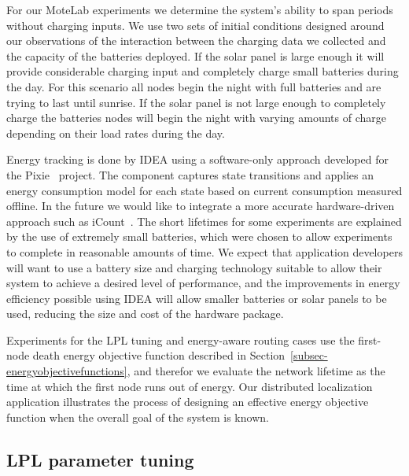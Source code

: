 For our MoteLab experiments we determine the system's ability to span periods
without charging inputs. We use two sets of initial conditions designed
around our observations of the interaction between the charging data we
collected and the capacity of the batteries deployed. If the solar panel is
large enough it will provide considerable charging input and completely
charge small batteries during the day. For this scenario all nodes begin the
night with full batteries and are trying to last until sunrise. If the solar
panel is not large enough to completely charge the batteries nodes will begin
the night with varying amounts of charge depending on their load rates during
the day.

Energy tracking is done by IDEA using a software-only approach developed for
the Pixie~\cite{pixie-sensys08} project. The component captures state
transitions and applies an energy consumption model for each state based on
current consumption measured offline. In the future we would like to
integrate a more accurate hardware-driven approach such as
iCount~\cite{icount-spots08}. The short lifetimes for some experiments are
explained by the use of extremely small batteries, which were chosen to allow
experiments to complete in reasonable amounts of time. We expect that
application developers will want to use a battery size and charging
technology suitable to allow their system to achieve a desired level of
performance, and the improvements in energy efficiency possible using IDEA
will allow smaller batteries or solar panels to be used, reducing the size
and cost of the hardware package.

Experiments for the LPL tuning and energy-aware routing cases use the
first-node death energy objective function described in
Section~\ref{subsec-energyobjectivefunctions}, and therefor we evaluate the
network lifetime as the time at which the first node runs out of energy. Our
distributed localization application illustrates the process of designing an
effective energy objective function when the overall goal of the system is
known.

\subsection{LPL parameter tuning}
\label{subsec-lplparametertuning}

